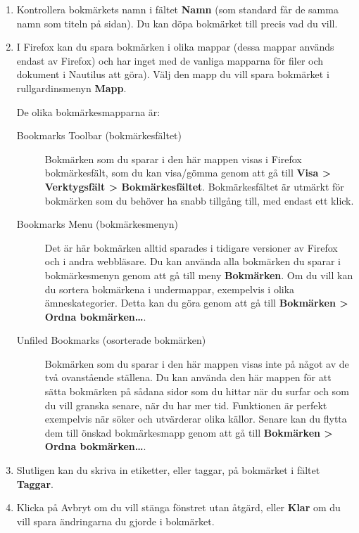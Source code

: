 \documentclass[a4paper,final]{memoir} %
\begin{document}
\begin{enumerate}

\item Kontrollera bokmärkets namn i fältet \textbf{Namn} (som standard får de samma namn som titeln på sidan). Du kan döpa bokmärket till precis vad du vill.

\item I Firefox kan du spara bokmärken i olika mappar (dessa mappar används endast av Firefox) och har inget med de vanliga mapparna för filer och dokument i Nautilus att göra). Välj den mapp du vill spara bokmärket i rullgardinsmenyn \textbf{Mapp}.

De olika bokmärkesmapparna är:

\begin{description}

\item[Bookmarks Toolbar (bokmärkesfältet)] Bokmärken som du sparar i den här mappen visas i Firefox bokmärkesfält, som du kan visa/gömma genom att gå till \textbf{Visa \textgreater{} Verktygsfält \textgreater{} Bokmärkesfältet}. Bokmärkesfältet är utmärkt för bokmärken som du behöver ha snabb tillgång till, med endast ett klick.

\item[Bookmarks Menu (bokmärkesmenyn)] Det är här bokmärken alltid sparades i tidigare versioner av Firefox och i andra webbläsare. Du kan använda alla bokmärken du sparar i bokmärkesmenyn genom att gå till meny \textbf{Bokmärken}. Om du vill kan du sortera bokmärkena i undermappar, exempelvis i olika ämneskategorier. Detta kan du göra genom att gå till \textbf{Bokmärken \textgreater{} Ordna bokmärken\ldots{}}.

\item[Unfiled Bookmarks (osorterade bokmärken)] Bokmärken som du sparar i den här mappen visas inte på något av de två ovanstående ställena. Du kan använda den här mappen för att sätta bokmärken på sådana sidor som du hittar när du surfar och som du vill granska senare, när du har mer tid. Funktionen är perfekt exempelvis när söker och utvärderar olika källor. Senare kan du flytta dem till önskad bokmärkesmapp genom att gå till \textbf{Bokmärken \textgreater{} Ordna bokmärken\ldots{}}.

\end{description}

\item Slutligen kan du skriva in etiketter, eller taggar, på bokmärket i fältet \textbf{Taggar}. 

\item Klicka på Avbryt om du vill stänga fönstret utan åtgärd, eller \textbf{Klar} om du vill spara ändringarna du gjorde i bokmärket.

\end{enumerate}
\end{document}
